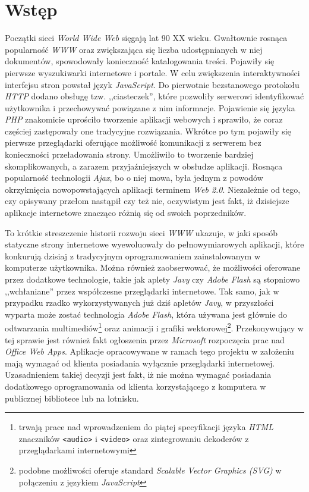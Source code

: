\documentclass[11pt,twoside]{report}
\begin{document}
\chapter{Wstęp}
Początki sieci \emph{World Wide Web} sięgają lat 90 XX
wieku. Gwałtownie rosnąca popularność \emph{WWW} oraz zwiększająca się
liczba udostępnianych w niej dokumentów, spowodowały konieczność
katalogowania treści. Pojawiły się pierwsze wyszukiwarki internetowe i
portale. W celu zwiększenia interaktywności interfejsu stron powstał
język \emph{JavaScript}. Do pierwotnie bezstanowego protokołu
\emph{HTTP} dodano obsługę tzw. ,,ciasteczek'', które pozwoliły
serwerowi identyfikować użytkownika i przechowywać powiązane z nim
informacje. Pojawienie się języka \emph{PHP} znakomicie uprościło
tworzenie aplikacji webowych i sprawiło, że coraz częściej zastępowały
one tradycyjne rozwiązania. %
Wkrótce po tym pojawiły się pierwsze przeglądarki oferujące możliwość
komunikacji z serwerem bez konieczności przeładowania
strony. Umożliwiło to tworzenie bardziej skomplikowanych, a zarazem
przyjaźniejszych w obsłudze aplikacji. Rosnąca popularność technologii
\emph{Ajax}, bo o niej mowa, była jednym z powodów okrzyknięcia
nowopowstających aplikacji terminem \emph{Web 2.0}. Niezależnie od
tego, czy opisywany przełom nastąpił czy też nie, oczywistym jest
fakt, iż dzisiejsze aplikacje internetowe znacząco różnią się od
swoich poprzedników.

To krótkie streszczenie historii rozwoju sieci \emph{WWW} ukazuje, w
jaki sposób statyczne strony internetowe wyewoluowały do
pełnowymiarowych aplikacji, które konkurują dzisiaj z tradycyjnym
oprogramowaniem zainstalowanym w komputerze użytkownika. Można również
zaobserwować, że możliwości oferowane przez dodatkowe technologie,
takie jak aplety \emph{Javy} czy \emph{Adobe Flash} są stopniowo
,,wchłaniane'' przez współczesne przeglądarki internetowe. Tak samo,
jak w przypadku rzadko wykorzystywanych już dziś apletów \emph{Javy},
w przyszłości wyparta może zostać technologia \emph{Adobe Flash},
która używana jest głównie do odtwarzania multimediów\footnote{trwają
  prace nad wprowadzeniem do piątej specyfikacji języka \emph{HTML}
  znaczników \texttt{<audio>} i \texttt{<video>} oraz zintegrowaniu
  dekoderów z przeglądarkami internetowymi} oraz animacji i grafiki
wektorowej\footnote{podobne możliwości oferuje standard \emph{Scalable
    Vector Graphics (SVG)} w połączeniu z językiem
  \emph{JavaScript}}. Przekonywujący w tej sprawie jest również fakt
ogłoszenia przez \emph{Microsoft} rozpoczęcia prac nad \emph{Office
  Web Apps}. Aplikacje opracowywane w ramach tego projektu w założeniu
mają wymagać od klienta posiadania wyłącznie przeglądarki
internetowej. Uzasadnieniem takiej decyzji jest fakt, iż nie można
wymagać posiadania dodatkowego oprogramowania od klienta
korzystającego z komputera w publicznej bibliotece lub na
lotnisku\cite{microsoft}.
\end{document}
